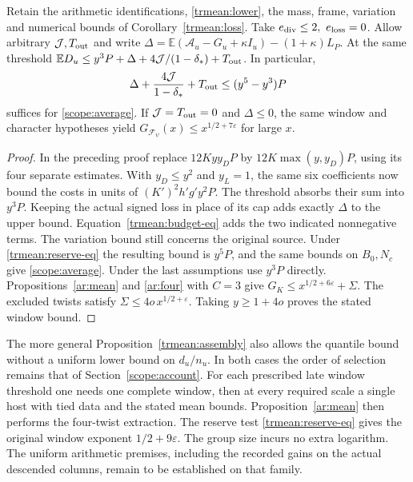 \begin{corollary}\label{trmean:reserve}
Retain the arithmetic identifications, \eqref{trmean:lower}, the mass,
frame, variation and numerical bounds of Corollary~\ref{trmean:loss}.
Take \(e_{\rm div}\le2,\ e_{\rm loss}=0\). Allow arbitrary
\(\mathcal J,T_{\rm out}\) and write
\(\Delta=\mathbb E(\mathcal A_u-G_u+\kappa I_u)-(1+\kappa)L_P\).
At the same threshold \(\mathbb E D_u\le y^3P+
\Delta+4\mathcal J/(1-\delta_*)+T_{\rm out}\). In particular,
\begin{equation}\label{trmean:reserve-eq}
 \Delta+\frac{4\mathcal J}{1-\delta_*}+T_{\rm out}
                 \le (y^5-y^3)P
\end{equation}
suffices for \eqref{scope:average}. If \(\mathcal J=T_{\rm out}=0\)
and \(\Delta\le0\), the same window and character hypotheses yield
\(G_{\mathcal F_\psi}(x)\le x^{1/2+7\varepsilon}\) for large \(x\).
\end{corollary}
\begin{proof}
In the preceding proof replace \(12Kyy_DP\) by
\(12K\max(y,y_D)P\), using its four separate estimates. With
\(y_D\le y^2\) and \(y_L=1\), the same six coefficients now bound
the costs in units of \((K')^2h'g'y^2P\). The threshold absorbs
their sum into \(y^3P\). Keeping the actual signed loss in place
of its cap adds exactly \(\Delta\) to the upper bound.
Equation~\eqref{trmean:budget-eq} adds the two indicated nonnegative
terms. The variation bound still concerns the original source. Under
\eqref{trmean:reserve-eq} the resulting bound is \(y^5P\), and the
same bounds on \(B_0,N_c\) give \eqref{scope:average}. Under the last
assumptions use \(y^3P\) directly. Propositions~\ref{ar:mean} and
\ref{ar:four} with \(C=3\) give \(G_K\le x^{1/2+6\varepsilon}+\Sigma\).
The excluded twists satisfy \(\Sigma\le4o\,x^{1/2+\varepsilon}\).
Taking \(y\ge1+4o\) proves the stated window bound.
\end{proof}

The more general
Proposition~\ref{trmean:assembly} also allows the quantile bound
without a uniform lower bound on \(d_u/n_u\).
In both cases the order of selection remains that of
Section~\ref{scope:account}. For each prescribed late window
threshold one needs one complete window, then at every required
scale a single host with tied data and the stated mean bounds.
Proposition~\ref{ar:mean} then performs the four-twist extraction.
The reserve test \eqref{trmean:reserve-eq} gives the original window
exponent \(1/2+9\varepsilon\).
The group size incurs no extra logarithm. The uniform arithmetic
premises, including the recorded gains on the actual descended
columns, remain to be established on that family.
